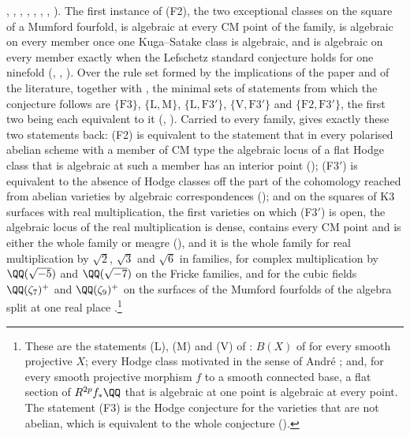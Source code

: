 \begin{theorem}[Closure]
\begin{enumerate}[label=\textup{(\roman*)},leftmargin=2.8em,itemsep=4pt]
  , ,
  , , ,
  , ,
  ). The first instance of
  \textup{(F2)}, the two exceptional classes on the square of a Mumford
  fourfold, is algebraic at every CM point of the family, is algebraic on
  every member once one Kuga--Satake class is algebraic, and is algebraic on
  every member exactly when the Lefschetz standard conjecture holds for one
  ninefold (, ,
  ). Over the rule set formed by the implications of
  the paper and of the literature, together with , the
  minimal sets of statements from which the conjecture follows are
  $\{\mathrm{F3}\}$, $\{\mathrm{L},\mathrm{M}\}$,
  $\{\mathrm{L},\mathrm{F3}'\}$, $\{\mathrm{V},\mathrm{F3}'\}$ and
  $\{\mathrm{F2},\mathrm{F3}'\}$, the first two being each equivalent to it
  (, ). Carried to every family,
  \cite[Theorem~1.1]{paperI} gives exactly these two statements back:
  \textup{(F2)} is equivalent to the statement that in every polarised
  abelian scheme with a member of CM type the algebraic locus of a flat
  Hodge class that is algebraic at such a member has an interior point
  (); \textup{(F3$'$)} is equivalent to the absence
  of Hodge classes off the part of the cohomology reached from abelian
  varieties by algebraic correspondences (); and on the
  squares of K3 surfaces with real multiplication, the first varieties on
  which \textup{(F3$'$)} is open, the algebraic locus of the real
  multiplication is dense, contains every CM point and is either the whole
  family or meagre (), and it is the whole family for
  real multiplication by $\sqrt2$, $\sqrt3$ and $\sqrt6$ in families, for
  complex multiplication by $\QQ(\sqrt{-5})$ and $\QQ(\sqrt{-7})$ on the
  Fricke families, and for the cubic fields $\QQ(\zeta_{7})^{+}$ and
  $\QQ(\zeta_{9})^{+}$ on the surfaces of the Mumford fourfolds of the
  algebra split at one real place \cite{BB26dense}.\footnote{These are the statements
  \textup{(L)}, \textup{(M)} and \textup{(V)} of : $B(X)$ of
  \cite[Definition~10.6]{paperI} for every smooth projective $X$; every Hodge class
  motivated in the sense of Andr\'e \cite[\S2.1]{And96b}; and, for every
  smooth projective morphism $f$ to a smooth connected base, a flat section of
  $R^{2p}f_{*}\QQ$ that is algebraic at one point is algebraic at every
  point. The statement (F3) is the Hodge conjecture for the varieties that
  are not abelian, which is equivalent to the whole conjecture
  ().}
\end{enumerate}
\end{theorem}

